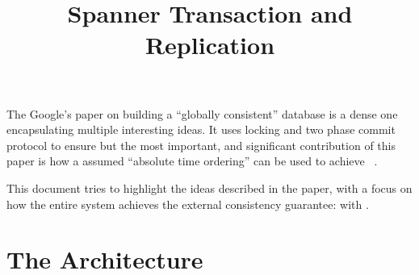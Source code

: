 



\tableofcontents

\title{Spanner Transaction and Replication}
\maketitle

The Google's paper on building a ``globally consistent'' database
is a dense one encapsulating multiple interesting ideas. It uses locking
and two phase commit protocol to ensure \Sconsistent but the most
important, and significant contribution of this paper is how a assumed
``absolute time ordering'' can be used to achieve \Lconsistent~\cite{Cooper_2013}.

This document tries to highlight the ideas described in the paper,
with a focus on how the entire system achieves the external consistency
guarantee: {\Sconsistent} with {\Lconsistent}.

\section{The Architecture}
